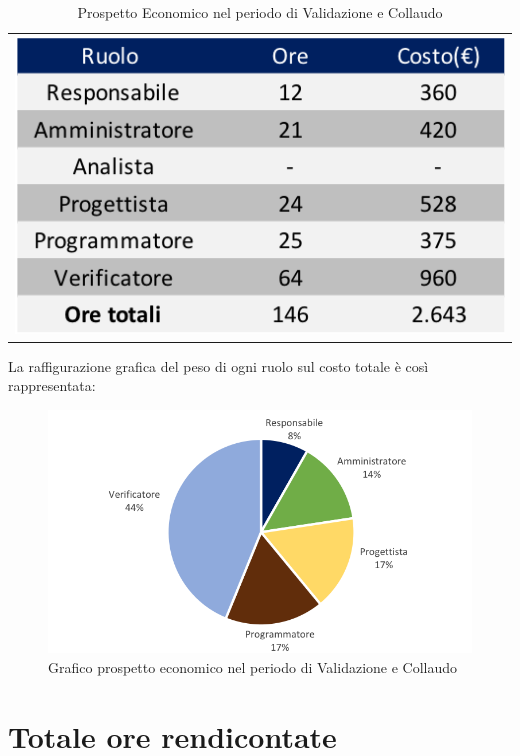 \begin{table}[!ht]
	\begin{center}
		\begin{tabular}{c}
			\includegraphics{images/tabellaValidazioneCollaudoEuro.png}
		\end{tabular}
		\caption{Prospetto Economico nel periodo di Validazione e Collaudo}
	\end{center}
\end{table}

La raffigurazione grafica del peso di ogni ruolo sul costo totale è così rappresentata:
\begin{figure}[!ht]
	\begin{center}
		\includegraphics{images/grafoValidazioneCollaudoEuro.png}
		\caption{Grafico prospetto economico nel periodo di Validazione e Collaudo}
	\end{center}
\end{figure}
\newpage
\section{Totale ore rendicontate}
